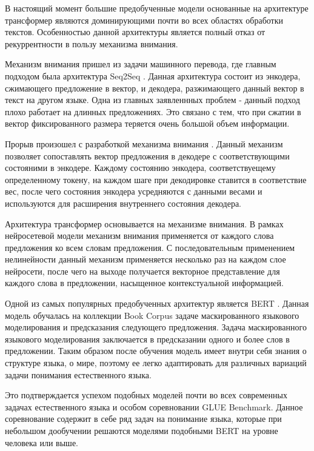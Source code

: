 В настоящий момент большие предобученные модели основанные на архитектуре трансформер являются доминирующими почти во всех областях обработки текстов. Особенностью данной архитектуры является полный отказ от рекуррентности в пользу механизма внимания.

Механизм внимания пришел из задачи машинного перевода, где главным подходом была архитектура Seq2Seq \cite{sutskever2014sequence}. Данная архитектура состоит из энкодера, сжимающего предложение в вектор, и декодера, разжимающего данный вектор в текст на другом языке. Одна из главных заявленнных проблем - данный подход плохо работает на длинных предложениях. Это связано с тем, что при сжатии в вектор фиксированного размера теряется очень большой объем информации.

Прорыв произошел с разработкой механизма внимания \cite{bahdanau2014neural}. Данный механизм позволяет сопоставлять вектор предложения в декодере с соответствующими состояними в энкодере. Каждому состоянию энкодера, соответствуещему определенному токену, на каждом шаге при декодировке ставится в соответствие вес, после чего состояния энкодера усредняются с данными весами и используются для расширения внутреннего состояния декодера.

Архитектура трансформер \cite{vaswani2017attention} основывается на механизме внимания. В рамках нейросетевой модели механизм внимания применяется от каждого слова предложения ко всем словам предложения. С последовательным применением нелинейности данный механизм применяется несколько раз на каждом слое нейросети, после чего на выходе получается векторное представление для каждого слова в предложении, насыщенное контекстуальной информацией.

Одной из самых популярных предобученных архитектур является BERT \cite{devlin2018bert}. Данная модель обучалась на коллекции Book Corpus задаче маскированного языкового моделирования и предсказания следующего предложения. Задача маскированного языкового  моделирования заключается в предсказании одного и более слов в предложении. Таким образом после обучения модель имеет внутри себя знания о структуре языка, о мире, поэтому ее легко адаптировать для различных вариаций задачи понимания естественного языка.

Это подтверждается успехом подобных моделей почти во всех современных задачах естественного языка и особом соревновании GLUE Benchmark. Данное соревнование содержит в себе ряд задач на понимание языка, которые при небольшом дообучении решаются моделями подобными BERT на уровне человека или выше.

